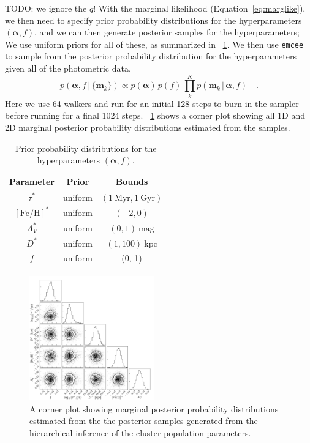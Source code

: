 \documentclass[twocolumn]{aastex62}
\newcommand{\todo}[1]{{\color{red} TODO: #1}}
\newcommand{\bs}[1]{\boldsymbol{#1}}
\newcommand{\equationname}{Equation}
\newcommand{\given}{\,|\,}
\newcommand{\kpc}{\textrm{kpc}}
\newcommand{\feh}{\ensuremath{[\textrm{Fe} / \textrm{H}]}}
\begin{document}
\todo{we ignore the $q$!}
With the marginal likelihood (\equationname~\ref{eq:marglike}), we then need to specify prior probability distributions for the hyperparameters $(\bs{\alpha}, f)$, and we can then generate posterior samples for the hyperparameters;
We use uniform priors for all of these, as summarized in \tablename~\ref{tbl:hyperpriors}.
We then use \texttt{emcee} \citep{Goodman:2010, emcee} to sample from the posterior probability distribution for the hyperparameters given all of the photometric data,
\begin{equation}
    p(\bs{\alpha}, f \given \{\bs{m}_k\}) \propto
        p(\bs{\alpha}) \, p(f) \,
        \prod_k^K p(\bs{m}_k \given \bs{\alpha}, f) \quad .
\end{equation}
Here we use 64 walkers and run for an initial 128 steps to burn-in the sampler before running for a final 1024 steps.
\figurename~\ref{fig:hierarch-corner} shows a corner plot showing all 1D and 2D marginal posterior probability distributions estimated from the samples.

\begin{table}[ht]
\begin{center}
    \begin{tabular}{ c | c | c }
        \toprule
        Parameter & Prior & Bounds \\
        \toprule
        $\tau^*$ & uniform & $(1~\textrm{Myr}, 1~\textrm{Gyr})$ \\
        $\feh^*$ & uniform & $(-2, 0)$ \\
        $A_V^*$ & uniform & $(0, 1)~\textrm{mag}$ \\
        $D^*$ & uniform & $(1, 100)~\kpc$ \\
        $f$ & uniform & (0, 1) \\
        \toprule
    \end{tabular}
\caption{Prior probability distributions for the hyperparameters $(\bs{\alpha}, f)$.
\label{tbl:hyperpriors}}
\end{center}
\end{table}


\begin{figure}
\centering
\includegraphics[width=0.48\textwidth]{figures/hierarch-corner.pdf}
\caption{A corner plot showing marginal posterior probability distributions estimated from the the posterior samples generated from the hierarchical inference of the cluster population parameters.}
\label{fig:hierarch-corner}
\end{figure}
\end{document}
